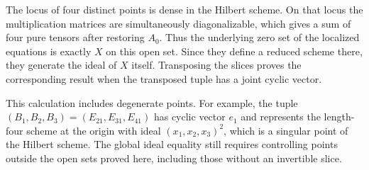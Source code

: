 \documentclass[11pt,a4paper]{article}
\begin{document}
The locus of four distinct points is dense in the Hilbert scheme. On
that locus the multiplication matrices are simultaneously
diagonalizable, which gives a sum of four pure tensors after restoring
\(A_0\). Thus the underlying zero set of the localized equations is
exactly \(X\) on this open set. Since they define a reduced scheme
there, they generate the ideal of \(X\) itself. Transposing the slices
proves the corresponding result when the transposed tuple has a joint
cyclic vector.

This calculation includes degenerate points. For example, the tuple
\((B_1,B_2,B_3)=(E_{21},E_{31},E_{41})\) has cyclic vector \(e_1\) and
represents the length-four scheme at the origin with ideal
\((x_1,x_2,x_3)^2\), which is a singular point of the Hilbert scheme.
The global ideal equality still requires controlling points outside the
open sets proved here, including those without an invertible slice.
\end{document}
